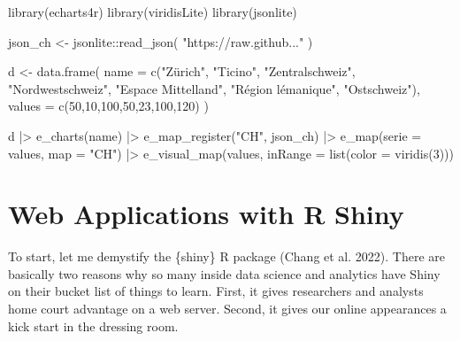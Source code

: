 \documentclass[
  12pt,
  letterpaper,
]{krantz}
\newenvironment{Shaded}{\begin{snugshade}}{\end{snugshade}}
\newcommand{\AttributeTok}[1]{\textcolor[rgb]{0.40,0.45,0.13}{#1}}
\newcommand{\DecValTok}[1]{\textcolor[rgb]{0.68,0.00,0.00}{#1}}
\newcommand{\FunctionTok}[1]{\textcolor[rgb]{0.28,0.35,0.67}{#1}}
\newcommand{\NormalTok}[1]{\textcolor[rgb]{0.00,0.23,0.31}{#1}}
\newcommand{\OtherTok}[1]{\textcolor[rgb]{0.00,0.23,0.31}{#1}}
\newcommand{\SpecialCharTok}[1]{\textcolor[rgb]{0.37,0.37,0.37}{#1}}
\newcommand{\StringTok}[1]{\textcolor[rgb]{0.13,0.47,0.30}{#1}}
\begin{document}
\begin{Shaded}
\begin{Highlighting}[]
\FunctionTok{library}\NormalTok{(echarts4r)}
\FunctionTok{library}\NormalTok{(viridisLite)}
\FunctionTok{library}\NormalTok{(jsonlite)}

\NormalTok{json\_ch }\OtherTok{\textless{}{-}}\NormalTok{ jsonlite}\SpecialCharTok{::}\FunctionTok{read\_json}\NormalTok{(}
  \StringTok{"https://raw.github..."}
\NormalTok{)}



\NormalTok{d }\OtherTok{\textless{}{-}} \FunctionTok{data.frame}\NormalTok{(}
  \AttributeTok{name =} \FunctionTok{c}\NormalTok{(}\StringTok{"Zürich"}\NormalTok{,}
           \StringTok{"Ticino"}\NormalTok{,}
           \StringTok{"Zentralschweiz"}\NormalTok{,}
           \StringTok{"Nordwestschweiz"}\NormalTok{,}
           \StringTok{"Espace Mittelland"}\NormalTok{,}
           \StringTok{"Région lémanique"}\NormalTok{,}
           \StringTok{"Ostschweiz"}\NormalTok{),}
  \AttributeTok{values =} \FunctionTok{c}\NormalTok{(}\DecValTok{50}\NormalTok{,}\DecValTok{10}\NormalTok{,}\DecValTok{100}\NormalTok{,}\DecValTok{50}\NormalTok{,}\DecValTok{23}\NormalTok{,}\DecValTok{100}\NormalTok{,}\DecValTok{120}\NormalTok{)}
\NormalTok{)}

\NormalTok{d }\SpecialCharTok{|\textgreater{}}
  \FunctionTok{e\_charts}\NormalTok{(name) }\SpecialCharTok{|\textgreater{}}
  \FunctionTok{e\_map\_register}\NormalTok{(}\StringTok{"CH"}\NormalTok{, json\_ch) }\SpecialCharTok{|\textgreater{}}
  \FunctionTok{e\_map}\NormalTok{(}\AttributeTok{serie =}\NormalTok{ values, }\AttributeTok{map =} \StringTok{"CH"}\NormalTok{) }\SpecialCharTok{|\textgreater{}}
  \FunctionTok{e\_visual\_map}\NormalTok{(values,}
               \AttributeTok{inRange =} \FunctionTok{list}\NormalTok{(}\AttributeTok{color =} \FunctionTok{viridis}\NormalTok{(}\DecValTok{3}\NormalTok{)))}
\end{Highlighting}
\end{Shaded}

\hypertarget{web-applications-with-r-shiny}{%
\section{Web Applications with R
Shiny}\label{web-applications-with-r-shiny}}

To start, let me demystify the \{shiny\} R package (Chang
et al. 2022). There are basically two reasons why so many inside data
science and analytics have Shiny on their bucket list of things to
learn. First, it gives researchers and analysts home court advantage on
a web server. Second, it gives our online appearances a kick start in
the dressing room.
\end{document}
